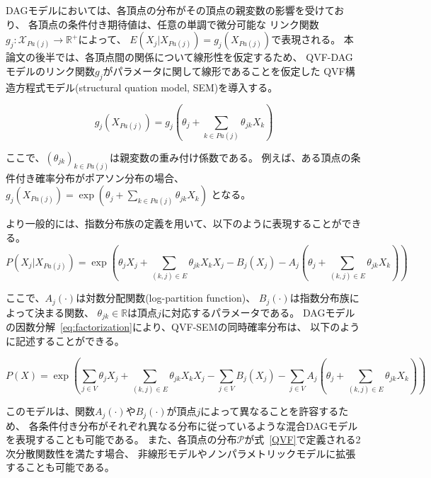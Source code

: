 DAGモデルにおいては、各頂点の分布がその頂点の親変数の影響を受けており、
各頂点の条件付き期待値は、任意の単調で微分可能な
リンク関数$g_j \colon \mathcal X_{Pa(j)} \rightarrow \mathbb R^+$によって、
$E(X_j|X_{Pa(j)}) = g_j(X_{Pa(j)})$で表現される。
本論文の後半では、各頂点間の関係について線形性を仮定するため、
QVF-DAGモデルのリンク関数$g_j$がパラメータに関して線形であることを仮定した
QVF構造方程式モデル(structural quation model, SEM)を導入する。

\begin{equation}
  g_j(X_{Pa(j)}) = g_j \left(\theta_j + \sum_{k \in Pa(j)} \theta_{jk}X_k \right)
\end{equation}

ここで、$(\theta_{jk})_{k \in Pa(j)}$は親変数の重み付け係数である。
例えば、ある頂点の条件付き確率分布がポアソン分布の場合、
$g_j(X_{Pa(j)}) = \exp(\theta_j + \sum_{k \in Pa(j)} \theta_{jk}X_k)$
となる。

より一般的には、指数分布族の定義を用いて、以下のように表現することができる。
\begin{equation}
  P(X_j|X_{Pa(j)}) = \exp \left( \theta_{j}X_j  + \sum_{(k,j)\in E} \theta_{jk}X_k X_j -
  B_j(X_j) - A_j \left( \theta_{j} + \sum_{(k,j) \in E} \theta_{jk} X_k \right) \right)
\end{equation}

ここで、$A_j(\cdot)$は対数分配関数(log-partition function)、
$B_j(\cdot)$は指数分布族によって決まる関数、
$\theta_{jk}\in \mathbb R$は頂点$j$に対応するパラメータである。
DAGモデルの因数分解~\eqref{eq:factorization}により、QVF-SEMの同時確率分布は、
以下のように記述することができる。

\begin{equation}
  P(X) = \exp \left( \sum_{j\in V} \theta_{j}X_j + \sum_{(k,j)\in E} \theta_{jk}X_k X_j
  - \sum_{j \in V} B_j(X_j) - \sum_{j \in V} A_j
  \left( \theta_{j} + \sum_{(k,j)\in E} \theta_{jk} X_k \right)\right)
  \label{eq:QVF_factorization}
\end{equation}

このモデルは、関数$A_j(\cdot)$や$B_j(\cdot)$が頂点$j$によって異なることを許容するため、
各条件付き分布がそれぞれ異なる分布に従っているような混合DAGモデルを表現することも可能である。
また、各頂点の分布$\mathcal P$が式~\eqref{QVF}で定義される2次分散関数性を満たす場合、
非線形モデルやノンパラメトリックモデルに拡張することも可能である。
